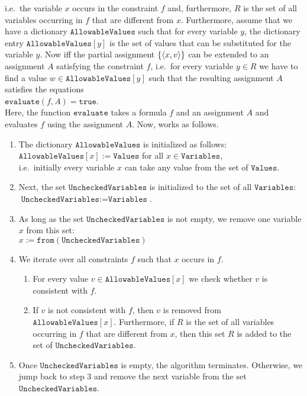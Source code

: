 i.e.~the variable $x$ occurs in the constraint $f$ and, furthermore, $R$ is the set of all variables occurring
in $f$ that are different from $x$.  Furthermore, assume that we have a dictionary $\texttt{AllowableValues}$ such that
for every variable $y$, the dictionary entry $\texttt{AllowableValues}[y]$ is the set of values that can be substituted
for the variable $y$.  Now   
iff the partial assignment $\{ \pair(x, v) \}$ can be extended to an assignment $A$ satisfying the constraint $f$,
i.e.~for every variable $y \in R$ we have to find a value $w \in \texttt{AllowableValues}[y]$ such that the resulting
assignment $A$ satisfies the equations
\\[0.2cm]
\hspace*{1.3cm}
$\texttt{evaluate}(f, A) = \texttt{true}$.
\\[0.2cm]
Here, the function $\texttt{evaluate}$ takes a formula $f$ and an assignment $A$ and evaluates $f$ using the
assignment $A$.  Now,  works as follows.
\begin{enumerate}
\item The dictionary $\texttt{AllowableValues}$ is initialized as follows:
      \\[0.2cm]
      \hspace*{1.3cm}
      $\texttt{AllowableValues}[x] := \texttt{Values}$ \quad for all $x \in \texttt{Variables}$,
      \\[0.2cm]
      i.e.~initially every variable $x$ can take any value from the set of $\texttt{Values}$.
\item Next, the set $\texttt{UncheckedVariables}$ is initialized to the set of all $\texttt{Variables}$:
      \\[0.2cm]
      \hspace*{1.3cm}
      $\texttt{UncheckedVariables} := \texttt{Variables}$.
\item As long as the set $\texttt{UncheckedVariables}$ is not empty, we remove one variable $x$ from this set:
      \\[0.2cm]
      \hspace*{1.3cm}
      $x := \texttt{from}(\texttt{UncheckedVariables})$
\item We iterate over all constraints $f$ such that $x$ occurs in $f$.  
      \begin{enumerate}
      \item For every value $v \in \texttt{AllowableValues}[x]$ we check whether $v$ is consistent with $f$.
      \item If $v$ is not consistent with $f$, then $v$ is removed from $\texttt{AllowableValues}[x]$.
            Furthermore, if $R$ is the set of all variables occurring in $f$ that are different from $x$, 
            then this set $R$ is added to the set of $\texttt{UncheckedVariables}$.
      \end{enumerate}
\item Once $\texttt{UncheckedVariables}$ is empty, the algorithm terminates.  Otherwise, we jump back to step 3
      and remove the next variable from the set $\texttt{UncheckedVariables}$.
\end{enumerate}
